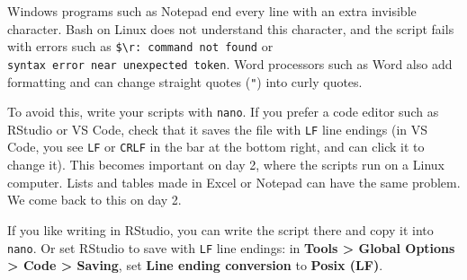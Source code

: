 \documentclass[
  letterpaper,
  DIV=11,
  numbers=noendperiod]{scrreprt}
\begin{document}
\begin{tcolorbox}[enhanced jigsaw, coltitle=black, breakable, titlerule=0mm, colback=white, rightrule=.15mm, bottomrule=.15mm, toprule=.15mm, colframe=quarto-callout-important-color-frame, colbacktitle=quarto-callout-important-color!10!white, bottomtitle=1mm, opacitybacktitle=0.6, toptitle=1mm, leftrule=.75mm, arc=.35mm, title=\textcolor{quarto-callout-important-color}{\faExclamation}\hspace{0.5em}{Important: Write scripts in nano or a code editor, not in Word or
Notepad}, left=2mm, opacityback=0]

Windows programs such as Notepad end every line with an extra invisible
character. Bash on Linux does not understand this character, and the
script fails with errors such as
\texttt{\$\textquotesingle{}\textbackslash{}r\textquotesingle{}:\ command\ not\ found}
or \texttt{syntax\ error\ near\ unexpected\ token}. Word processors such
as Word also add formatting and can change straight quotes (\texttt{"})
into curly quotes.

To avoid this, write your scripts with \texttt{nano}. If you prefer a
code editor such as RStudio or VS Code, check that it saves the file
with \texttt{LF} line endings (in VS Code, you see \texttt{LF} or
\texttt{CRLF} in the bar at the bottom right, and can click it to change
it). This becomes important on day 2, where the scripts run on a Linux
computer. Lists and tables made in Excel or Notepad can have the same
problem. We come back to this on day 2.

If you like writing in RStudio, you can write the script there and copy
it into \texttt{nano}. Or set RStudio to save with \texttt{LF} line
endings: in \textbf{Tools \textgreater{} Global Options \textgreater{}
Code \textgreater{} Saving}, set \textbf{Line ending conversion} to
\textbf{Posix (LF)}.

\end{tcolorbox}
\end{document}
